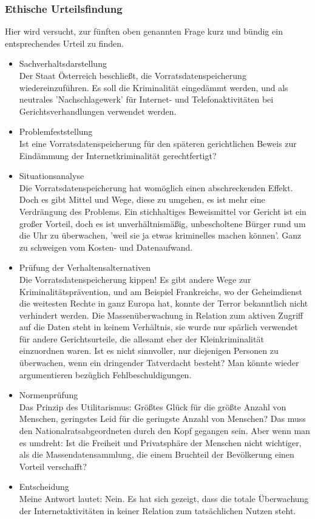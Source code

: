 \documentclass[letterpaper, 12pt]{article}
\let\tempsubsubsection\subsubsection
\renewcommand\subsubsection[1]{\vspace{0cm}\tempsubsubsection{#1}\vspace{0cm}}
\begin{document}
\subsubsection{Ethische Urteilsfindung}

Hier wird versucht, zur fünften oben genannten Frage kurz und bündig ein entsprechendes Urteil zu finden.

\begin{itemize}
	\item Sachverhaltsdarstellung \\
	Der Staat Österreich beschließt, die Vorratsdatenspeicherung wiedereinzuführen. Es soll die Kriminalität eingedämmt werden, und als neutrales 'Nachschlagewerk' für Internet- und Telefonaktivitäten bei Gerichtsverhandlungen verwendet werden.
	\item Problemfeststellung \\
	Ist eine Vorratsdatenspeicherung für den späteren gerichtlichen Beweis zur Eindämmung der
Internetkriminalität gerechtfertigt?
	\item Situationsanalyse \\
	Die Vorratsdatenspeicherung hat womöglich einen abschreckenden Effekt. Doch es gibt Mittel und Wege, diese zu umgehen, es ist mehr eine Verdrängung des Problems. Ein stichhaltiges Beweismittel vor Gericht ist ein großer Vorteil, doch es ist unverhältnismäßig, unbescholtene Bürger rund um die Uhr zu überwachen, 'weil sie ja etwas kriminelles machen können'. Ganz zu schweigen vom Kosten- und Datenaufwand. \clearpage
	\item Prüfung der Verhaltensalternativen \\
	Die Vorratsdatenspeicherung kippen! Es gibt andere Wege zur Kriminalitätsprävention, und am Beispiel Frankreichs, wo der Geheimdienst die weitesten Rechte in ganz Europa hat, konnte der Terror bekanntlich nicht verhindert werden. Die Massenüberwachung in Relation zum aktiven Zugriff auf die Daten steht in keinem Verhältnis, sie wurde nur spärlich verwendet für andere Gerichtsurteile, die allesamt eher der Kleinkriminalität einzuordnen waren. Ist es nicht sinnvoller, nur diejenigen Personen zu überwachen, wenn ein dringender Tatverdacht besteht? Man könnte wieder argumentieren bezüglich Fehlbeschuldigungen.
	\item Normenprüfung \\
	Das Prinzip des Utilitarismus: Größtes Glück für die größte Anzahl von Menschen, 
geringstes Leid für die geringste Anzahl von Menschen? Das muss den Nationalratsabgeordneten durch den Kopf gegangen sein. Aber wenn man es umdreht: Ist die Freiheit und Privatsphäre der Menschen nicht wichtiger, als die Massendatensammlung, die einem Bruchteil der Bevölkerung einen Vorteil verschafft?
	\item Entscheidung \\
	Meine Antwort lautet: Nein. Es hat sich gezeigt, dass die totale Überwachung der Internetaktivitäten in keiner Relation zum tatsächlichen Nutzen steht. 
\end{itemize}
\end{document}
